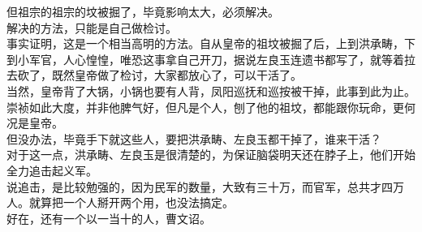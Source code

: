 \begin{multicols}{\theparacolNo}
但祖宗的祖宗的坟被掘了，毕竟影响太大，必须解决。\\

解决的方法，只能是自己做检讨。\\

事实证明，这是一个相当高明的方法。自从皇帝的祖坟被掘了后，上到洪承畴，下到小军官，人心惶惶，唯恐这事拿自己开刀，据说左良玉连遗书都写了，就等着拉去砍了，既然皇帝做了检讨，大家都放心了，可以干活了。\\

当然，皇帝背了大锅，小锅也要有人背，凤阳巡抚和巡按被干掉，此事到此为止。\\

崇祯如此大度，并非他脾气好，但凡是个人，刨了他的祖坟，都能跟你玩命，更何况是皇帝。\\

但没办法，毕竟手下就这些人，要把洪承畴、左良玉都干掉了，谁来干活？\\

对于这一点，洪承畴、左良玉是很清楚的，为保证脑袋明天还在脖子上，他们开始全力追击起义军。\\

说追击，是比较勉强的，因为民军的数量，大致有三十万，而官军，总共才四万人。就算把一个人掰开两个用，也没法搞定。\\

好在，还有一个以一当十的人，曹文诏。\\
\ifnum{}
	\end{multicols}
\fi
\newpage
